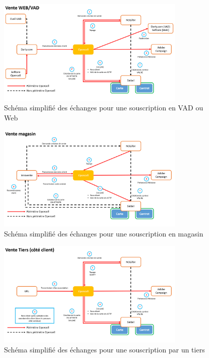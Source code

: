 \documentclass[12pt, a4paper]{report}
\begin{document}
	\begin{figure}[!h]
		\centering
		\includegraphics[width=0.8\textwidth]{assets/images/vente_webvad.png}
		\caption{Schéma simplifié des échanges pour une souscription en VAD ou Web}
	\end{figure}
	\vspace{.5cm}
	\begin{figure}[!h]
		\centering
		\includegraphics[width=0.8\textwidth]{assets/images/vente_magasin.png}
		\caption{Schéma simplifié des échanges pour une souscription en magasin}
	\end{figure}
	\vspace{.5cm}
	\begin{figure}[!h]
		\centering
		\includegraphics[width=0.8\textwidth]{assets/images/vente_tiers.png}
		\caption{Schéma simplifié des échanges pour une souscription par un tiers}
	\end{figure}
\end{document}
